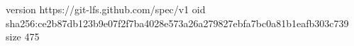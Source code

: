 version https://git-lfs.github.com/spec/v1
oid sha256:ce2b87db123b9e07f2f7ba4028e573a26a279827ebfa7bc0a81b1eafb303c739
size 475

